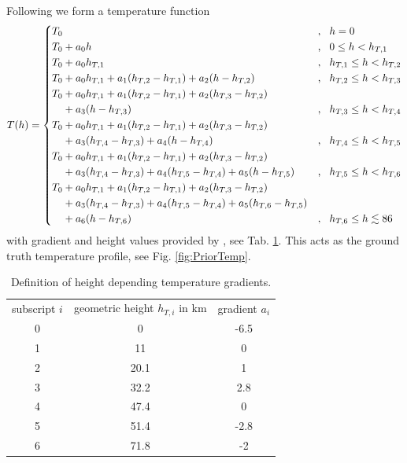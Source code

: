 Following \cite{atmosphere1976us} we form a temperature function
\begin{align}
	T(h) = \begin{cases*}
			T_0 &, \, \text{$h  = 0$}\\
			T_0 + a_0 h   &, \, \text{$0 \leq h < h_{T,1}$}\\
			T_0 + a_0 h_{T,1} &, \, \text{$h_{T,1} \leq  h < h_{T,2}$}\\
			T_0 + a_0 h_{T,1} + a_1 (h_{T,2}   - h_{T,1})  + a_2 (h   - h_{T,2})  &,  \, \text{$h_{T,2} \leq h < h_{T,3}$}\\
			T_0 + a_0 h_{T,1} + a_1 (h_{T,2}   - h_{T,1})  + a_2 (h_{T,3}   - h_{T,2}) &\nonumber \\
			\hphantom{{} T_0 }  + a_3 (h   - h_{T,3}) &, \, \text{$h_{T,3} \leq h < h_{T,4}$}\\
			T_0 + a_0 h_{T,1} + a_1 (h_{T,2}   - h_{T,1})  + a_2 (h_{T,3}   - h_{T,2}) &\nonumber \\
			\hphantom{{} T_0 } + a_3 (h_{T,4}   - h_{T,3}) + a_4 (h   - h_{T,4}) &,  \, \text{$h_{T,4} \leq h < h_{T,5}$}\\
			T_0 + a_0 h_{T,1} + a_1 (h_{T,2}   - h_{T,1})  + a_2 (h_{T,3}   - h_{T,2}) &\nonumber \\
			\hphantom{{} T_0 } + a_3 (h_{T,4}   - h_{T,3}) + a_4 (h_{T,5}   - h_{T,4})+ a_5 (h   - h_{T,5}) &,  \, \text{$h_{T,5} \leq h < h_{T,6}$}\\
			T_0 + a_0 h_{T,1} + a_1 (h_{T,2}   - h_{T,1}) + a_2 (h_{T,3}   - h_{T,2})   &\nonumber\\
			\hphantom{{} T_0}  + a_3 (h_{T,4}   - h_{T,3}) + a_4 (h_{T,5}   - h_{T,4})+ a_5 (h_{T,6}   - h_{T,5}) &\nonumber\\ \hphantom{{} T_0} + a_6 (h   - h_{T,6})   &,  \, \text{$h_{T,6} \leq h \lesssim 86$}
	\end{cases*} 
\label{eq:tempFunc}
\end{align}
with gradient and height values provided by \cite{atmosphere1976us}, see Tab. \ref{tab:tempGrad}.
This acts as the ground truth temperature profile, see Fig. \ref{fig:PriorTemp}.
\begin{table}
	\centering
	\begin{tabular}{ |c||c|c|  }
		\hline
		subscript $i$ & geometric height $h_{T,i}$ in km&gradient $a_i$\\
		\hhline{|=||=|=|}
		0& 0 & -6.5\\
		1& 11 & 0\\
		2& 20.1& 1\\
		3& 32.2& 2.8\\
		4& 47.4& 0\\
		5& 51.4& -2.8\\
		6& 71.8& -2\\
		\hline
	\end{tabular}
\caption[Height depending temperature gradients]{Definition of height depending temperature gradients.}
\label{tab:tempGrad}
\end{table}

